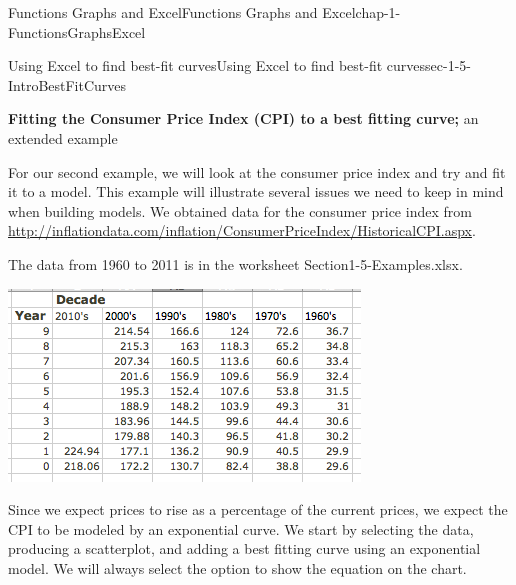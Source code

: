 \documentclass[oneside,10pt,]{book}
\newcommand{\terminology}[1]{\textbf{#1}}
\numberwithin{equation}{section}
\begin{document}
\begin{chapterptx}{Functions Graphs and Excel}{}{Functions Graphs and Excel}{}{}{chap-1-FunctionsGraphsExcel}
\begin{sectionptx}{Using Excel to find best-fit curves}{}{Using Excel to find best-fit curves}{}{}{sec-1-5-IntroBestFitCurves}
\begin{sidebyside}{1}{0.1}{0.1}{0}
\begin{sbspanel}{0.8}
\end{sbspanel}%
\end{sidebyside}%
%
\par
\hypertarget{p-388}{}%
\terminology{Fitting the Consumer Price Index (CPI) to a best fitting curve;} an extended example%
\par
\hypertarget{p-389}{}%
For our second example, we will look at the consumer price index and try and fit it to a model.  This example will illustrate several issues we need to keep in mind when building models.  We obtained data for the consumer price index from \href{http://inflationdata.com/inflation/Consumer_Price_Index/HistoricalCPI.aspx}{http:\slash{}\slash{}inflationdata.com\slash{}inflation\slash{}Consumer\textunderscore{}Price\textunderscore{}Index\slash{}HistoricalCPI.aspx}.%
\par
\hypertarget{p-390}{}%
The data from 1960 to 2011 is in the worksheet Section1-5-Examples.xlsx. \leavevmode%
\begin{sidebyside}{1}{0.1}{0.1}{0}%
\begin{sbspanel}{0.8}%
\includegraphics[width=1\linewidth]{images/sec1-5-9.png}
\end{sbspanel}%
\end{sidebyside}%
%
\par
\hypertarget{p-391}{}%
Since we expect prices to rise as a percentage of the current prices, we expect the CPI to be modeled by an exponential curve.  We start by selecting the data, producing a scatterplot, and adding a best fitting curve using an exponential model.  We will always select the option to show the equation on the chart. \leavevmode%
\begin{sidebyside}{1}{0.1}{0.1}{0}%
\begin{sbspanel}{0.8}%

\end{sbspanel}
\end{sidebyside}
\end{sectionptx}
\end{chapterptx}
\end{document}
